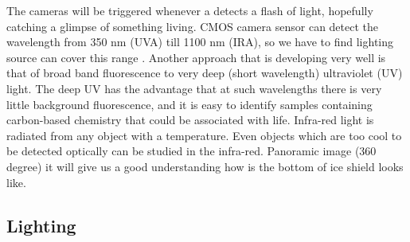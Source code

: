 
The cameras will be triggered whenever a detects a flash of light, hopefully catching a glimpse of something living. CMOS camera sensor can detect the wavelength from 350 nm (UVA) till 1100 nm (IRA), so we have to find lighting source can cover this range .
Another approach that is developing very well is that of broad band fluorescence to very deep (short wavelength) ultraviolet (UV) light. The deep UV has the advantage that at such wavelengths there is very little background fluorescence, and it is easy to identify samples containing carbon-based chemistry that could be associated with life.
Infra-red light is radiated from any object with a temperature. Even objects which are too cool to be detected optically can be studied in the infra-red.
Panoramic image (360 degree) it will give us a good understanding how is the bottom of ice shield looks like.

\subsection{Lighting}

